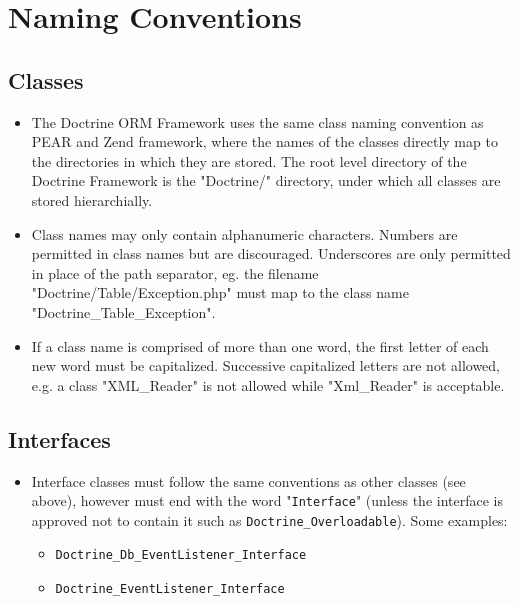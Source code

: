 \documentclass[11pt,a4paper]{report}
\begin{document}
\section{Naming Conventions}
\subsection{Classes}
\begin{itemize}
\item{The Doctrine ORM Framework uses the same class naming convention as PEAR and Zend framework, where the names of the classes directly map to the directories in which they are stored. The root level directory of the Doctrine Framework is the "Doctrine/" directory, under which all classes are stored hierarchially.}
\item{Class names may only contain alphanumeric characters. Numbers are permitted in class names but are discouraged. Underscores are only permitted in place of the path separator, eg. the filename "Doctrine/Table/Exception.php" must map to the class name "Doctrine\_Table\_Exception".}
\item{If a class name is comprised of more than one word, the first letter of each new word must be capitalized. Successive capitalized letters are not allowed, e.g. a class "XML\_Reader" is not allowed while "Xml\_Reader" is acceptable.}
\end{itemize}
\subsection{Interfaces}
\begin{itemize}
\item{Interface classes must follow the same conventions as other classes (see above), however must end with the word "\texttt{Interface}" (unless the interface is approved not to contain it such as  \texttt{Doctrine\_Overloadable}). Some examples:}
\begin{itemize}
\item{\texttt{Doctrine\_Db\_EventListener\_Interface}}
\item{\texttt{Doctrine\_EventListener\_Interface}}
\end{itemize}
\end{itemize}
\end{document}
